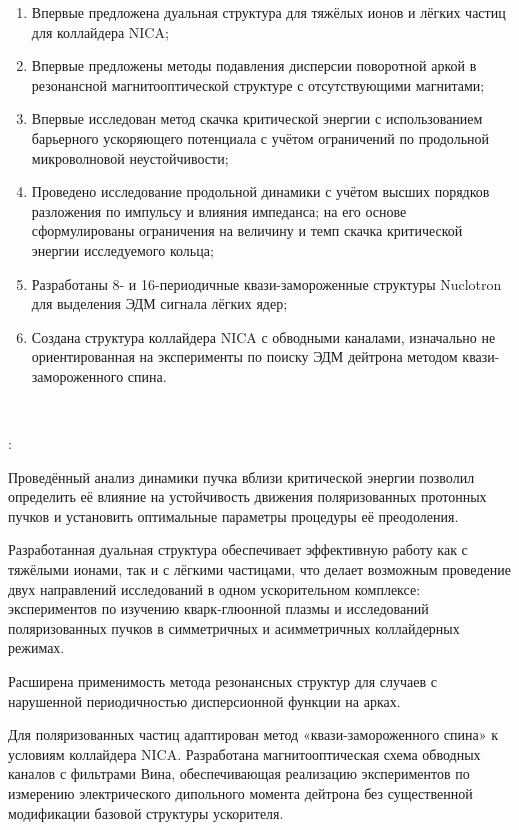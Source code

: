 \begin{enumerate}[beginpenalty=10000] %
	\item	Впервые предложена дуальная структура для тяжёлых ионов и лёгких частиц для коллайдера NICA;
	\item 	Впервые предложены методы подавления дисперсии поворотной аркой в резонансной магнитооптической структуре с отсутствующими магнитами;
	\item 	Впервые исследован метод скачка критической энергии с использованием барьерного ускоряющего потенциала с учётом ограничений по продольной микроволновой неустойчивости;
	\item	Проведено исследование продольной динамики с учётом высших порядков разложения по импульсу и влияния импеданса; на его основе сформулированы ограничения на величину и темп скачка критической энергии исследуемого кольца;
	\item	Разработаны 8- и 16-периодичные квази-замороженные структуры Nuclotron для выделения ЭДМ сигнала лёгких ядер;
	\item	Создана структура коллайдера NICA с обводными каналами, изначально не ориентированная на эксперименты по поиску ЭДМ дейтрона методом квази-замороженного спина.
\end{enumerate}
~\\
\par {\influence}:
\par	Проведённый анализ динамики пучка вблизи критической энергии позволил определить её влияние на устойчивость движения поляризованных протонных пучков и установить оптимальные параметры процедуры её преодоления.

\par	Разработанная дуальная структура обеспечивает эффективную работу как с тяжёлыми ионами, так и с лёгкими частицами, что делает возможным проведение двух направлений исследований в одном ускорительном комплексе: экспериментов по изучению кварк-глюонной плазмы и исследований поляризованных пучков в симметричных и асимметричных коллайдерных режимах.

\par Расширена применимость метода резонансных структур для случаев с нарушенной периодичностью дисперсионной функции на арках.

\par Для поляризованных частиц адаптирован метод «квази-замороженного спина» к условиям коллайдера NICA. Разработана магнитооптическая схема обводных каналов с фильтрами Вина, обеспечивающая реализацию экспериментов по измерению электрического дипольного момента дейтрона без существенной модификации базовой структуры ускорителя. 

